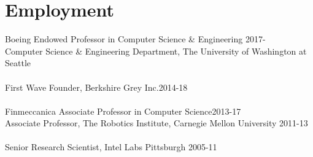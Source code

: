 
\section{Employment}
\noindent
Boeing Endowed Professor in Computer Science \& Engineering \hfill 2017-\\
Computer Science \& Engineering Department, 
The University of Washington at Seattle\\
\\
First Wave Founder, Berkshire Grey Inc.\hfill 2014-18\\
\\
Finmeccanica Associate Professor in Computer Science\hfill 2013-17\\
Associate Professor, 
The Robotics Institute,  Carnegie Mellon University
\hfill 2011-13\\
\\
Senior Research Scientist, Intel Labs Pittsburgh \hfill 2005-11

